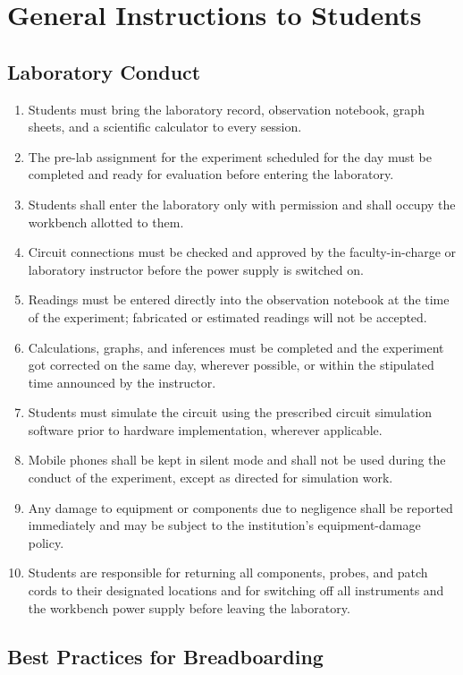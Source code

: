 \chapter*{General Instructions to Students}
\section*{Laboratory Conduct}
\begin{enumerate}[label=\arabic*.]
	\item Students must bring the laboratory record, observation notebook, graph sheets, and a scientific calculator to every session.
	\item The pre-lab assignment for the experiment scheduled for the day must be completed and ready for evaluation before entering the laboratory.
	\item Students shall enter the laboratory only with permission and shall occupy the workbench allotted to them.
	\item Circuit connections must be checked and approved by the faculty-in-charge or laboratory instructor before the power supply is switched on.
	\item Readings must be entered directly into the observation notebook at the time of the experiment; fabricated or estimated readings will not be accepted.
	\item Calculations, graphs, and inferences must be completed and the experiment got corrected on the same day, wherever possible, or within the stipulated time announced by the instructor.
	\item Students must simulate the circuit using the prescribed circuit simulation software prior to hardware implementation, wherever applicable.
	\item Mobile phones shall be kept in silent mode and shall not be used during the conduct of the experiment, except as directed for simulation work.
	\item Any damage to equipment or components due to negligence shall be reported immediately and may be subject to the institution's equipment-damage policy.
	\item Students are responsible for returning all components, probes, and patch cords to their designated locations and for switching off all instruments and the workbench power supply before leaving the laboratory.
\end{enumerate}
\section*{Best Practices for Breadboarding}

